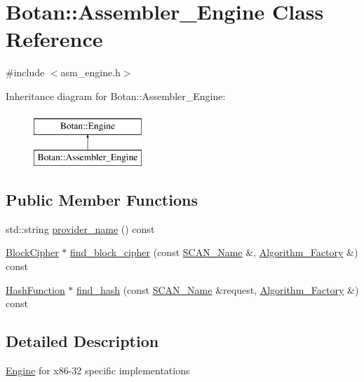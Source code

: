 \hypertarget{classBotan_1_1Assembler__Engine}{\section{Botan\-:\-:Assembler\-\_\-\-Engine Class Reference}
\label{classBotan_1_1Assembler__Engine}
}


{\ttfamily \#include $<$asm\-\_\-engine.\-h$>$}

Inheritance diagram for Botan\-:\-:Assembler\-\_\-\-Engine\-:\begin{figure}[H]
\begin{center}
\leavevmode
\includegraphics[height=2.000000cm]{classBotan_1_1Assembler__Engine}
\end{center}
\end{figure}
\subsection*{Public Member Functions}
\begin{DoxyCompactItemize}
\item 
std\-::string \hyperlink{classBotan_1_1Assembler__Engine_a3c1d172c7d3d04bd68a05e1a6da2ecd7}{provider\-\_\-name} () const 
\item 
\hyperlink{classBotan_1_1BlockCipher}{Block\-Cipher} $\ast$ \hyperlink{classBotan_1_1Assembler__Engine_a981477a493d31eba94fdf9179377bc25}{find\-\_\-block\-\_\-cipher} (const \hyperlink{classBotan_1_1SCAN__Name}{S\-C\-A\-N\-\_\-\-Name} \&, \hyperlink{classBotan_1_1Algorithm__Factory}{Algorithm\-\_\-\-Factory} \&) const 
\item 
\hyperlink{classBotan_1_1HashFunction}{Hash\-Function} $\ast$ \hyperlink{classBotan_1_1Assembler__Engine_a09c5ea8ba159196e73b2d239327949f6}{find\-\_\-hash} (const \hyperlink{classBotan_1_1SCAN__Name}{S\-C\-A\-N\-\_\-\-Name} \&request, \hyperlink{classBotan_1_1Algorithm__Factory}{Algorithm\-\_\-\-Factory} \&) const 
\end{DoxyCompactItemize}


\subsection{Detailed Description}
\hyperlink{classBotan_1_1Engine}{Engine} for x86-\/32 specific implementations 

